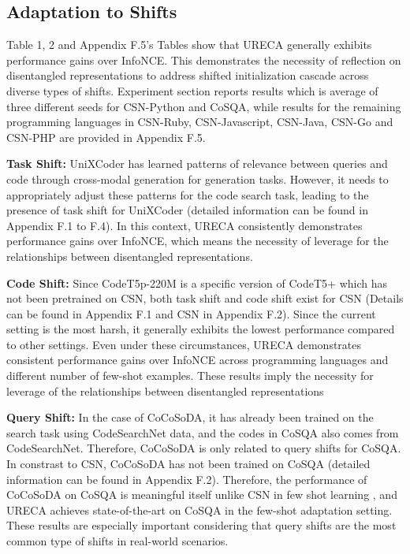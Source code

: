\subsection{Adaptation to Shifts}
Table 1, 2 and Appendix F.5's Tables show that URECA generally exhibits performance gains over InfoNCE.
This demonstrates the necessity of reflection on disentangled representations to address shifted initialization cascade
across diverse types of shifts.
Experiment section reports results which is average of three different seeds for CSN-Python and CoSQA, 
while results for the remaining programming languages in CSN-Ruby, CSN-Javascript, CSN-Java, CSN-Go and CSN-PHP 
are provided in Appendix F.5.

\textbf{Task Shift: }
UniXCoder has learned patterns of relevance between queries and code through cross-modal generation for generation tasks. 
However, it needs to appropriately adjust these patterns for the code search task, 
leading to the presence of task shift for UniXCoder (detailed information can be found 
in Appendix F.1 to F.4).
In this context, URECA consistently demonstrates performance gains over InfoNCE, 
which means the necessity of leverage for the relationships between disentangled representations.

\textbf{Code Shift: }
Since CodeT5p-220M is a specific version of CodeT5+ 
which has not been pretrained on CSN, both task shift and code shift exist for CSN 
(Details can be found in Appendix F.1 and CSN in Appendix F.2).
Since the current setting is the most harsh, it generally exhibits the lowest performance compared to other settings.
Even under these circumstances, URECA demonstrates consistent performance gains over InfoNCE 
across programming languages and different number of few-shot examples.
These results imply the necessity for leverage of the relationships between disentangled representations 


\textbf{Query Shift: }
In the case of CoCoSoDA, it has already been trained on the search task using CodeSearchNet data, 
and the codes in CoSQA also comes from CodeSearchNet. 
Therefore, CoCoSoDA is only related to query shifts for CoSQA.
In constrast to CSN, CoCoSoDA has not been trained on CoSQA (detailed information can be found in Appendix F.2).
Therefore, the performance of CoCoSoDA on CoSQA is meaningful itself unlike CSN in few shot learning  
, and URECA achieves state-of-the-art on CoSQA in the few-shot adaptation setting.
These results are especially important considering that query shifts are the most common type of shifts in real-world scenarios.

